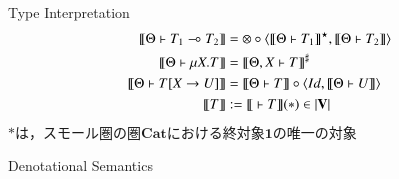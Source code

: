 \documentclass[8pt]{jsarticle}
\newcommand{\semantics}[1]{{\llbracket #1 \rrbracket}}
\begin{document}
\begin{itembox}[c]{Type Interpretation}
\begin{align*}
    \semantics{\Theta \vdash T_1\multimap{}T_2}  &= \otimes\circ\langle\semantics{\Theta \vdash T_1}^\star,\semantics{\Theta \vdash T_2}\rangle \\
    \semantics{\Theta \vdash \mu{X}.T}           &= \semantics{\Theta,X \vdash T}^\sharp \\
    \semantics{\Theta \vdash T[X \rightarrow U]} &= \semantics{\Theta \vdash T}\circ\langle{Id,\semantics{\Theta \vdash U}}\rangle \\
    \semantics{T}                                &:= \semantics{\; \vdash T}(\ast) \in |{\bf V}|
  \end{align*}
  $\ast$は，スモール圏の圏$\mathbf{Cat}$における終対象$\mathbf{1}$の唯一の対象
\end{itembox}

\begin{itembox}[c]{Denotational Semantics}

\end{itembox}
\end{document}
